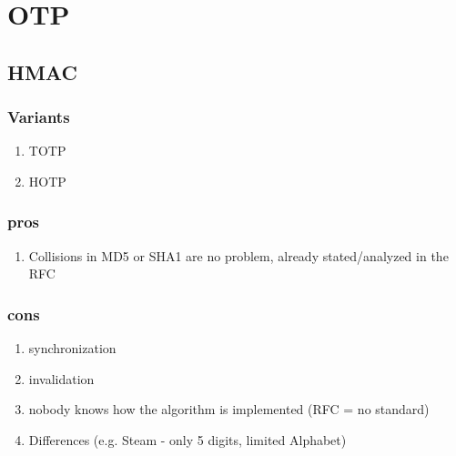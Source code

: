 \section{OTP}

\subsection{HMAC}

\subsubsection{Variants}

\begin{enumerate}
	\item TOTP
	\item HOTP
\end{enumerate}

\subsubsection{pros}

\begin{enumerate}
	\item Collisions in MD5 or SHA1 are no problem, already stated/analyzed in the RFC
\end{enumerate}

\subsubsection{cons}

\begin{enumerate}
	\item synchronization
	\item invalidation
	\item nobody knows how the algorithm is implemented (RFC = no standard)
	\item Differences (e.g. Steam - only 5 digits, limited Alphabet)
\end{enumerate}